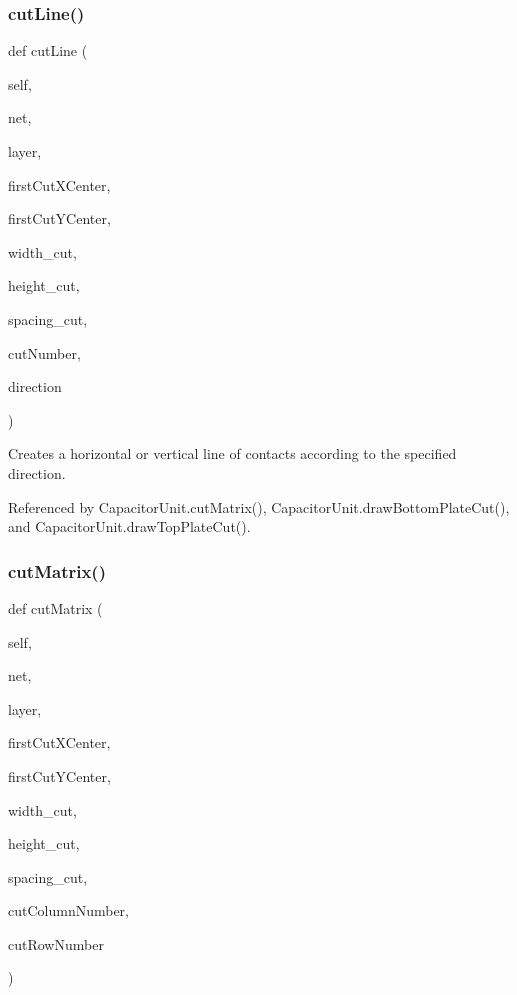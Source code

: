 \subsubsection{\texorpdfstring{cut\+Line()}{cutLine()}}
{\footnotesize\ttfamily def cut\+Line (\begin{DoxyParamCaption}\item[{}]{self,  }\item[{}]{net,  }\item[{}]{layer,  }\item[{}]{first\+Cut\+X\+Center,  }\item[{}]{first\+Cut\+Y\+Center,  }\item[{}]{width\+\_\+cut,  }\item[{}]{height\+\_\+cut,  }\item[{}]{spacing\+\_\+cut,  }\item[{}]{cut\+Number,  }\item[{}]{direction }\end{DoxyParamCaption})}



Creates a horizontal or vertical line of contacts according to the specified direction. 



Referenced by Capacitor\+Unit.\+cut\+Matrix(), Capacitor\+Unit.\+draw\+Bottom\+Plate\+Cut(), and Capacitor\+Unit.\+draw\+Top\+Plate\+Cut().

\mbox{\label{classpython_1_1capacitorunit_1_1CapacitorUnit_ab29fb045a7f82b35194cbb94892fd1a1}} 
\subsubsection{\texorpdfstring{cut\+Matrix()}{cutMatrix()}}
{\footnotesize\ttfamily def cut\+Matrix (\begin{DoxyParamCaption}\item[{}]{self,  }\item[{}]{net,  }\item[{}]{layer,  }\item[{}]{first\+Cut\+X\+Center,  }\item[{}]{first\+Cut\+Y\+Center,  }\item[{}]{width\+\_\+cut,  }\item[{}]{height\+\_\+cut,  }\item[{}]{spacing\+\_\+cut,  }\item[{}]{cut\+Column\+Number,  }\item[{}]{cut\+Row\+Number }\end{DoxyParamCaption})}



